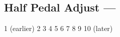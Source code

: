 \subsection[Half Pedal Adjust]{Half Pedal Adjust --- \UiKey{\I}\UiKey{\SET}}










































1 (earlier)
2
3
4
5
6
7
8
9
10 (later)
